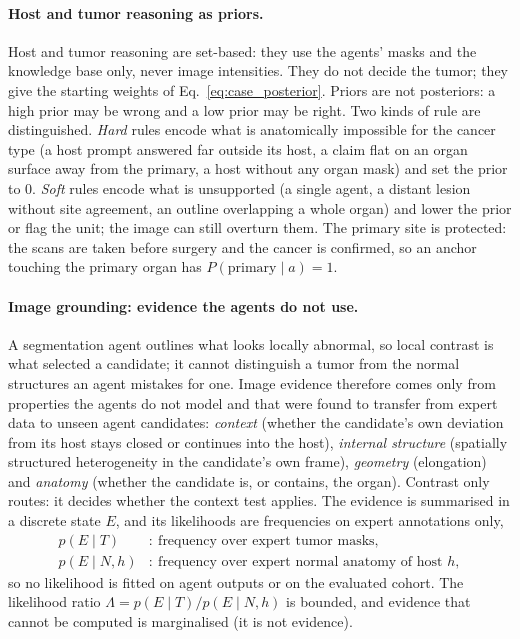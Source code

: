\documentclass[fleqn,10pt]{olplainarticle}
\begin{document}
\paragraph{Host and tumor reasoning as priors.}
Host and tumor reasoning are set-based: they use the agents' masks and the knowledge base only, never image intensities.
They do not decide the tumor; they give the starting weights of Eq.~\eqref{eq:case_posterior}. Priors are not
posteriors: a high prior may be wrong and a low prior may be right. Two kinds of rule are distinguished. \emph{Hard} rules
encode what is anatomically impossible for the cancer type (a host prompt answered far outside its host, a claim flat on
an organ surface away from the primary, a host without any organ mask) and set the prior to $0$. \emph{Soft} rules encode
what is unsupported (a single agent, a distant lesion without site agreement, an outline overlapping a whole organ) and
lower the prior or flag the unit; the image can still overturn them. The primary site is protected: the scans are taken
before surgery and the cancer is confirmed, so an anchor touching the primary organ has $P(\text{primary}\mid a)=1$.

\paragraph{Image grounding: evidence the agents do not use.}
A segmentation agent outlines what looks locally abnormal, so local contrast is what selected a candidate; it cannot
distinguish a tumor from the normal structures an agent mistakes for one. Image evidence therefore comes only from
properties the agents do not model and that were found to transfer from expert data to unseen agent candidates:
\emph{context} (whether the candidate's own deviation from its host stays closed or continues into the host),
\emph{internal structure} (spatially structured heterogeneity in the candidate's own frame), \emph{geometry} (elongation)
and \emph{anatomy} (whether the candidate is, or contains, the organ). Contrast only routes:
it decides whether the context test applies. The evidence is summarised in a discrete state $E$, and its likelihoods are
frequencies on expert annotations only,
\begin{equation}
\label{eq:likelihoods}
\begin{aligned}
p(E\mid T)&:\ \text{frequency over expert tumor masks},\\
p(E\mid N,h)&:\ \text{frequency over expert normal anatomy of host }h,
\end{aligned}
\end{equation}
so no likelihood is fitted on agent outputs or on the evaluated cohort. The likelihood ratio
$\Lambda=p(E\mid T)/p(E\mid N,h)$ is bounded, and evidence that cannot be computed is marginalised (it is not evidence).
\end{document}
